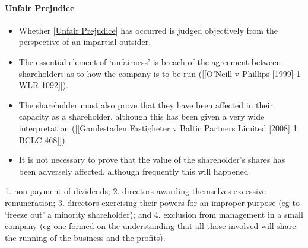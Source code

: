 \documentclass[
]{article}
\newenvironment{Shaded}{}{}
\newcommand{\NormalTok}[1]{#1}
\providecommand{\tightlist}{%
  \setlength{\itemsep}{0pt}\setlength{\parskip}{0pt}}
\begin{document}
\hypertarget{unfair-prejudice}{%
\paragraph{Unfair Prejudice}\label{unfair-prejudice}}

\begin{itemize}
\tightlist
\item
  Whether {[}\protect\hyperlink{unfair-prejudice}{Unfair Prejudice}{]}
  has occurred is judged objectively from the perspective of an
  impartial outsider.
\item
  The essential element of `unfairness' is breach of the agreement
  between shareholders as to how the company is to be run ({[}{[}O'Neill
  v Phillips {[}1999{]} 1 WLR 1092{]}{]}).
\item
  The shareholder must also prove that they have been affected in their
  capacity as a shareholder, although this has been given a very wide
  interpretation ({[}{[}Gamlestaden Fastigheter v Baltic Partners
  Limited {[}2008{]} 1 BCLC 468{]}{]}).
\item
  It is not necessary to prove that the value of the shareholder's
  shares has been adversely affected, although frequently this will
  happened
\end{itemize}

\begin{Shaded}
\begin{Highlighting}[]
\NormalTok{1. non{-}payment of dividends;}
\NormalTok{2. directors awarding themselves excessive remuneration;}
\NormalTok{3. directors exercising their powers for an improper purpose (eg to ‘freeze out’ a minority shareholder); and}
\NormalTok{4. exclusion from management in a small company (eg one formed on the understanding that all those involved will share the running of the business and the profits).}
\end{Highlighting}
\end{Shaded}
\end{document}
